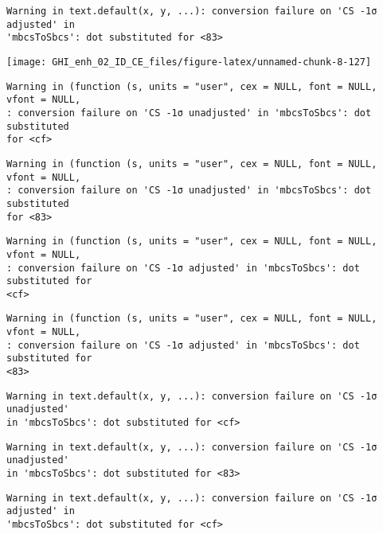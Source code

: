 \documentclass[
  10pt,
  a4paper,oneside]{article}
\begin{document}
\begin{verbatim}
Warning in text.default(x, y, ...): conversion failure on 'CS -1σ adjusted' in
'mbcsToSbcs': dot substituted for <83>
\end{verbatim}

\begin{center}\texttt{[image: GHI\_enh\_02\_ID\_CE\_files/figure-latex/unnamed-chunk-8-127]} \end{center}

\begin{verbatim}
Warning in (function (s, units = "user", cex = NULL, font = NULL, vfont = NULL,
: conversion failure on 'CS -1σ unadjusted' in 'mbcsToSbcs': dot substituted
for <cf>
\end{verbatim}

\begin{verbatim}
Warning in (function (s, units = "user", cex = NULL, font = NULL, vfont = NULL,
: conversion failure on 'CS -1σ unadjusted' in 'mbcsToSbcs': dot substituted
for <83>
\end{verbatim}

\begin{verbatim}
Warning in (function (s, units = "user", cex = NULL, font = NULL, vfont = NULL,
: conversion failure on 'CS -1σ adjusted' in 'mbcsToSbcs': dot substituted for
<cf>
\end{verbatim}

\begin{verbatim}
Warning in (function (s, units = "user", cex = NULL, font = NULL, vfont = NULL,
: conversion failure on 'CS -1σ adjusted' in 'mbcsToSbcs': dot substituted for
<83>
\end{verbatim}

\begin{verbatim}
Warning in text.default(x, y, ...): conversion failure on 'CS -1σ unadjusted'
in 'mbcsToSbcs': dot substituted for <cf>
\end{verbatim}

\begin{verbatim}
Warning in text.default(x, y, ...): conversion failure on 'CS -1σ unadjusted'
in 'mbcsToSbcs': dot substituted for <83>
\end{verbatim}

\begin{verbatim}
Warning in text.default(x, y, ...): conversion failure on 'CS -1σ adjusted' in
'mbcsToSbcs': dot substituted for <cf>
\end{verbatim}
\end{document}
